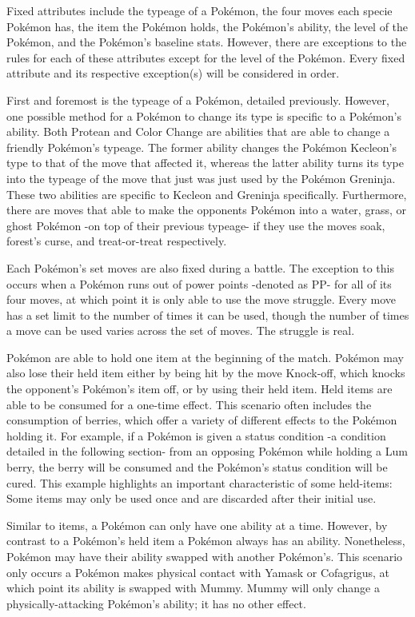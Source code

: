 \documentclass[12pt,twoside]{reedthesis}
\begin{document}
  Fixed attributes include the typeage of a Pokémon, the four moves each
  specie Pokémon has, the item the Pokémon holds, the Pokémon's ability,
  the level of the Pokémon, and the Pokémon's baseline stats. However,
  there are exceptions to the rules for each of these attributes except
  for the level of the Pokémon. Every fixed attribute and its respective
  exception(s) will be considered in order.
  
  First and foremost is the typeage of a Pokémon, detailed previously.
  However, one possible method for a Pokémon to change its type is
  specific to a Pokémon's ability. Both Protean and Color Change are
  abilities that are able to change a friendly Pokémon's typeage. The
  former ability changes the Pokémon Kecleon's type to that of the move
  that affected it, whereas the latter ability turns its type into the
  typeage of the move that just was just used by the Pokémon Greninja.
  These two abilities are specific to Kecleon and Greninja specifically.
  Furthermore, there are moves that able to make the opponents Pokémon
  into a water, grass, or ghost Pokémon -on top of their previous typeage-
  if they use the moves soak, forest's curse, and treat-or-treat
  respectively.
  
  Each Pokémon's set moves are also fixed during a battle. The exception
  to this occurs when a Pokémon runs out of power points -denoted as PP-
  for all of its four moves, at which point it is only able to use the
  move struggle. Every move has a set limit to the number of times it can
  be used, though the number of times a move can be used varies across the
  set of moves. The struggle is real.
  
  Pokémon are able to hold one item at the beginning of the match. Pokémon
  may also lose their held item either by being hit by the move Knock-off,
  which knocks the opponent's Pokémon's item off, or by using their held
  item. Held items are able to be consumed for a one-time effect. This
  scenario often includes the consumption of berries, which offer a
  variety of different effects to the Pokémon holding it. For example, if
  a Pokémon is given a status condition -a condition detailed in the
  following section- from an opposing Pokémon while holding a Lum berry,
  the berry will be consumed and the Pokémon's status condition will be
  cured. This example highlights an important characteristic of some
  held-items: Some items may only be used once and are discarded after
  their initial use.
  
  Similar to items, a Pokémon can only have one ability at a time.
  However, by contrast to a Pokémon's held item a Pokémon always has an
  ability. Nonetheless, Pokémon may have their ability swapped with
  another Pokémon's. This scenario only occurs a Pokémon makes physical
  contact with Yamask or Cofagrigus, at which point its ability is swapped
  with Mummy. Mummy will only change a physically-attacking Pokémon's
  ability; it has no other effect.
  
\end{document}
